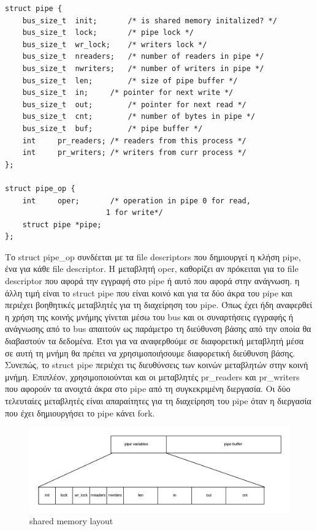 \begin{lstlisting}
struct pipe {
	bus_size_t	init;		/* is shared memory initalized? */
	bus_size_t	lock;		/* pipe lock */
	bus_size_t	wr_lock;	/* writers lock */
	bus_size_t	nreaders;	/* number of readers in pipe */
	bus_size_t	nwriters;	/* number of writers in pipe */
	bus_size_t	len;		/* size of pipe buffer */
	bus_size_t	in;		/* pointer for next write */
	bus_size_t	out;		/* pointer for next read */
	bus_size_t	cnt;		/* number of bytes in pipe */
	bus_size_t	buf;		/* pipe buffer */
	int		pr_readers;	/* readers from this process */
	int		pr_writers;	/* writers from curr process */
};

struct pipe_op {
	int		oper;		/* operation in pipe 0 for read,
					   1 for write*/
	struct pipe	*pipe;
};
\end{lstlisting}

Το struct pipe\_op συνδέεται με τα file descriptors που δημιουργεί η κλήση pipe,
ένα για κάθε file descriptor. H μεταβλητή oper, καθορίζει αν πρόκειται για το
file descriptor που αφορά την εγγραφή στο pipe ή αυτό που αφορά στην ανάγνωση. η
άλλη τιμή είναι το struct pipe που είναι κοινό και για τα δύο άκρα του pipe και
περιέχει βοηθητικές μεταβλητές για τη διαχείρηση του pipe. Όπως έχει ήδη
αναφερθεί η χρήση της κοινής μνήμης γίνεται μέσω του bus και οι συναρτήσεις
εγγραφής ή ανάγνωσης από το bus απαιτούν ως παράμετρο τη διεύθυνση βάσης από την
οποία θα διαβαστούν τα δεδομένα. Έτσι για να αναφερθούμε σε διαφορετική
μεταβλητή μέσα σε αυτή τη μνήμη θα πρέπει να χρησιμοποιήσουμε διαφορετική
διεύθυνση βάσης. Συνεπώς, το struct pipe περιέχει τις διευθύνσεις των κοινών
μεταβλητών στην κοινή μνήμη. Επιπλέον, χρησιμοποιούνται και οι μεταβλητές
pr\_readers και pr\_writers που αφορούν τα ανοιχτά άκρα στο pipe από τη
συγκεκριμένη διεργασία. Οι δύο τελευταίες μεταβλητές είναι απαραίτητες για τη
διαχείρηση του pipe όταν η διεργασία που έχει δημιουργήσει το pipe κάνει fork.

\begin{figure}[htp]
\centering
\includegraphics[scale=0.7]{figures/shared_memoery_layout.png}
\caption{shared memory layout\label{fig4_5}}
\end{figure}

